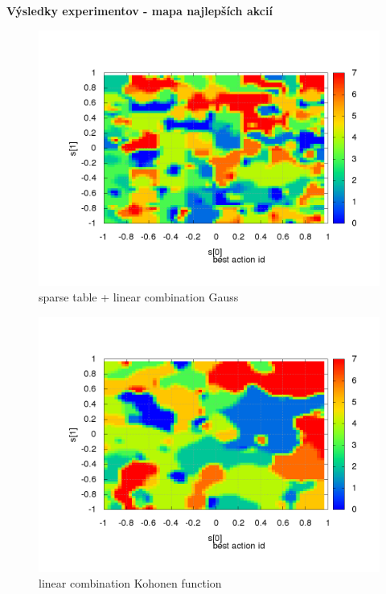 \documentclass[xcolor=dvipsnames]{beamer}
\begin{document}
\begin{frame}{\bf Výsledky experimentov - mapa najlepších akcií}

\begin{minipage}{.5\textwidth}

\begin{figure}[!htb]
\centering
\includegraphics[scale=.2]{../../results_q_learning/map_1/function_type_3/iterations_10/action_best_value_log_surface.png}
\caption{sparse table + linear combination Gauss}
\end{figure}


\end{minipage}%
\begin{minipage}{.5\textwidth}

\begin{figure}[!htb]
\centering
\includegraphics[scale=.2]{../../results_q_learning/map_1/function_type_4/iterations_10/action_best_value_log_surface.png}
\caption{linear combination Kohonen function}
\end{figure}


\end{minipage}
\end{frame}
\end{document}
